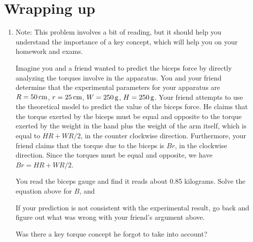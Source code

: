 \section*{Wrapping up}
\begin{enumerate}[labproc]
	\item 
		Note:  This problem involves a bit of reading,
		but it should help you understand the importance of a key
		concept, which will help you on your homework and exams.

		Imagine you and a friend wanted to predict the biceps force by 
		directly analyzing the torques involve in the apparatus.
		You and your friend determine that the experimental parameters for
		your apparatus are 
		$R=50\,\mathrm{cm}$, $r=25\,\mathrm{cm}$,
		$W=250\,\mathrm{g}$, $H=250\,\mathrm{g}$.
		Your friend attempts to use the theoretical model
		to predict the value of the biceps force.
		He claims that the torque exerted by the biceps must be equal and 
		opposite to the torque exerted by the weight in the hand
		plus the weight of the arm itself, 
		which is equal to $H R + W R/2$, in the counter clockwise direction.
		Furthermore, your friend claims that the torque due to
		the biceps is $B r$, in the clockwise direction.
		Since the torques must be equal and opposite, we have
		$Br=HR+WR/2$.

		You read the biceps gauge and find it reads about 0.85 kilograms.
		Solve the equation above for $B$, and 

		If your prediction is not consistent with the experimental result, 
		go back and figure out what was wrong with your friend's argument
		above.  

		Was there a key torque concept he forgot to take into account?



\end{enumerate}
